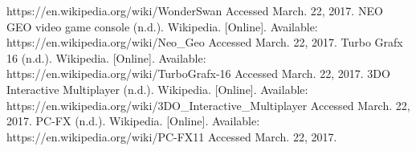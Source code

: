 \begin{thebibliography}{1}
  https://en.wikipedia.org/wiki/WonderSwan
  Accessed March. 22, 2017.
  NEO GEO video game console (n.d.). Wikipedia. [Online]. Available:
  https://en.wikipedia.org/wiki/Neo\_Geo
  Accessed March. 22, 2017.
  Turbo Grafx 16 (n.d.). Wikipedia. [Online]. Available:
  https://en.wikipedia.org/wiki/TurboGrafx-16
  Accessed March. 22, 2017.
  3DO Interactive Multiplayer (n.d.). Wikipedia. [Online]. Available:
  https://en.wikipedia.org/wiki/3DO\_Interactive\_Multiplayer
  Accessed March. 22, 2017.
  PC-FX (n.d.). Wikipedia. [Online]. Available:
  https://en.wikipedia.org/wiki/PC-FX11
  Accessed March. 22, 2017.





\end{thebibliography}
